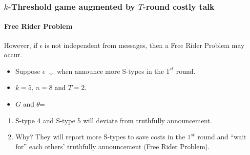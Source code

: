 \documentclass[10pt]{beamer}
\begin{document}
\begin{frame}
   \frametitle{$k$-Threshold game augmented by $T$-round costly talk}
\framesubtitle{Free Rider Problem}

\alert{However}, if $\epsilon$ is \alert{not independent from messages}, then a \alert{Free Rider Problem} may occur.
\begin{itemize}
\item Suppose $\epsilon$ \alert{$\downarrow$} when announce \alert{more} S-types in the \alert{$1^{st}$} round.
\item $k=5$, $n=8$ and $T=2$.
\item $G$ and $\theta$=
\begin{center}
\end{center}



\end{itemize}

\begin{enumerate}
\item S-type \alert{4} and S-type \alert{5} will deviate from truthfully announcement.
\item Why? They will report more S-types to save costs in the $1^{st}$ round and ``wait for'' each others' truthfully announcement (Free Rider Problem).
\end{enumerate}


\end{frame}
\end{document}
